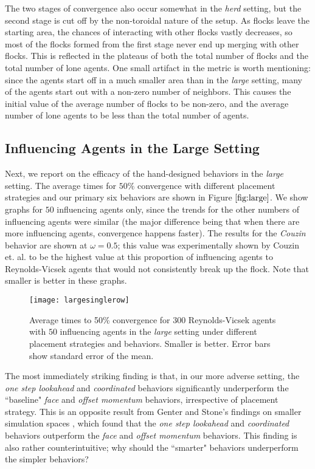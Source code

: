 The two stages of convergence also occur somewhat in the \textit{herd} setting,
but the second stage is cut off by the non-toroidal nature of the setup.
As flocks leave the starting area, the chances of interacting with other flocks
vastly decreases, so most of the flocks formed from the first stage never end up
merging with other flocks.
This is reflected in the plateaus of both the total number of flocks and the total
number of lone agents.
One small artifact in the metric is worth mentioning: since the agents start
off in a much smaller area than in the \textit{large} setting, many of the
agents start out with a non-zero number of neighbors.
This causes the initial value of the average number of flocks to be non-zero, and
the average number of lone agents to be less than the total number of agents.

\subsection{Influencing Agents in the Large Setting}

Next, we report on the efficacy of the hand-designed behaviors in the
\textit{large} setting.
The average times for $50\%$ convergence with different placement strategies
and our primary six behaviors are shown in Figure $\ref{fig:large}$.
We show graphs for $50$ influencing agents only, since the trends for the other
numbers of influencing agents were similar (the major difference being that
when there are more influencing agents, convergence happens faster).
The results for the \textit{Couzin} behavior are shown at $\omega = 0.5$; this
value was experimentally shown by Couzin et. al. to be the highest value at
this proportion of influencing agents to Reynolds-Vicsek agents that would not
consistently break up the flock.
Note that smaller is better in these graphs.
\begin{figure}
    \texttt{[image: largesinglerow]}
    \caption{Average times to 50\% convergence for $300$ Reynolds-Vicsek agents
    with $50$ influencing agents in the \textit{large} setting under different
    placement strategies and behaviors.
    Smaller is better.
    Error bars show standard error of the mean.}
    \label{fig:large}
\end{figure}

The most immediately striking finding is that, in our more adverse setting,
the \textit{one step lookahead} and \textit{coordinated} behaviors
significantly underperform the ``baseline" \textit{face} and
\textit{offset momentum} behaviors, irrespective of placement strategy.
This is an opposite result from Genter and Stone's findings on smaller simulation
spaces \cite{genter201612steplookahead, genterthesis}, which found that the
\textit{one step lookahead} and \textit{coordinated} behaviors outperform the
\textit{face} and \textit{offset momentum} behaviors.
This finding is also rather counterintuitive; why should the ``smarter" behaviors
underperform the simpler behaviors?


